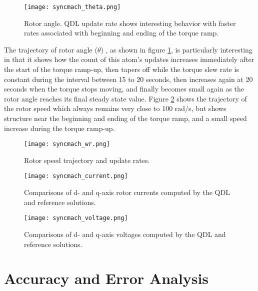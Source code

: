 \begin{figure}[h]
    \centering
    \texttt{[image: syncmach\_theta.png]}
    \caption{Rotor angle. QDL update rate shows interesting behavior with faster rates associated with beginning and ending of the torque ramp.}
    \label{fig:syncmach_theta}
\end{figure}

The trajectory of rotor angle ($\theta$) , as shown in figure \ref{fig:syncmach_theta}, is particularly interesting in that it shows how the count of this atom’s updates increases immediately after the start of the torque ramp-up, then tapers off while the torque slew rate is constant during the interval between 15 to 20 seconds, then increases again at 20 seconds when the torque stops moving, and finally becomes small again as the rotor angle reaches its final steady state value. Figure \ref{fig:syncmach_wr} shows the trajectory of the rotor speed which always remains very close to 100 rad/s, but shows structure near the beginning and ending of the torque ramp, and a small speed increase during the torque ramp-up.

\begin{figure}[h]
    \centering
    \texttt{[image: syncmach\_wr.png]}
    \caption{Rotor speed trajectory and update rates.}
    \label{fig:syncmach_wr}
\end{figure}

\begin{figure}[h]
    \centering
    \texttt{[image: syncmach\_current.png]}
    \caption{Comparisons of d- and q-axis rotor currents computed by the QDL and reference solutions.}
    \label{fig:syncmach_current}
\end{figure}

\begin{figure}[h]
    \centering
    \texttt{[image: syncmach\_voltage.png]}
    \caption{Comparisons of d- and q-axis voltages computed by the QDL and reference solutions.}
    \label{fig:syncmach_voltage}
\end{figure}

\section{Accuracy and Error Analysis}

